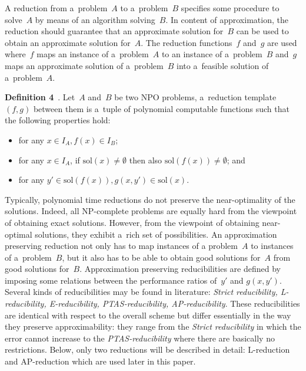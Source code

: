 \begin{multicols}{2}
A reduction from a~problem~$A$ to a~problem~$B$ specifies some
procedure to solve~$A$ by means of an algorithm solving~$B$. In
content of approximation, the reduction should guarantee that an
approximate solution for~$B$ can be used to obtain an approximate
solution for~$A$. The reduction functions~$f$ and~$g$ are used where~$f$
maps an instance of a~problem~$A$ to an instance of a~problem~$B$
and~$g$ maps an approximate solution of a~problem~$B$ into
a~feasible solution of a~problem~$A$.

\smallskip

\noindent
\textbf{Definition 4}~\cite{TrevisanLuca}. Let~$A$ and~$B$ be two {NPO}
problems, a~reduction template $(f,g)$ between them is a~tuple of polynomial
computable functions such that the following properties hold:
\begin{itemize}
\item for any $x \in I_{A}, f(x) \in I_{B}$;\\[-14pt]
\item for any $x \in I_{A}$, if  $\mathrm{sol}\left(x\right) \neq \emptyset$ then also
$\mathrm{sol}\left(f(x)\right) \neq \emptyset$; and\\[-14pt]
\item for any $y' \in \mathrm{sol}\left(f(x)\right),g(x,y') \in \mathrm{sol}\left(x\right)$.
\end{itemize}

\smallskip

Typically, polynomial time reductions do not preserve the
near-optimality of the solutions. Indeed, all {NP}-complete
problems are equally hard from the viewpoint of obtaining exact
solutions. However, from the viewpoint of obtaining near-optimal
solutions, they exhibit a~rich set of possibilities. An
approximation preserving reduction not only has to map instances of
a problem~$A$ to instances of a~problem~$B$, but it also has to be
able to obtain good solutions for~$A$ from good solutions for~$B$.
Approximation preserving reducibilities are defined by imposing some
relations between the performance ratios of~$y'$ and $g(x,y')$.
Several kinds of reducibilities may be found in literature:
\textit{Strict reducibility, L-reducibility, E-reducibility,
PTAS-reducibility, AP-reducibility}.
These reducibilities are identical with respect to the overall scheme but
differ essentially in the way they preserve approximability: they
range from the \textit{Strict reducibility} in which the error
cannot increase to the \textit{PTAS-reducibility} where there are
basically no restrictions. Below,  only two
reductions will be described in detail:
L-reduction and AP-reduction which are used later in this paper.


\end{multicols}
